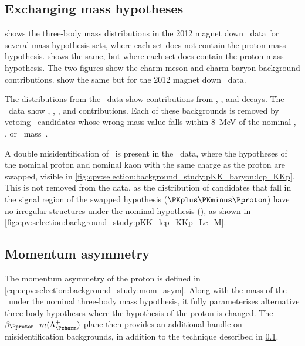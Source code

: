\subsection{Exchanging mass hypotheses}
\label{chap:cpv:selection:background_study:mass_hypo}

 shows the three-body mass
distributions in the 2012 magnet down \pKK\ data for several mass hypothesis
sets, where each set does not contain the proton mass hypothesis.
 shows the same, but where
each set does contain the proton mass hypothesis.
The two figures show the charm meson and charm baryon background contributions.
show the same but for the 2012 magnet down \ppipi\ data.

The distributions from the \pKK\ data show contributions from
\decay{\PDplus}{\PKplus\PKminus\Ppiplus},
\decay{\PDsplus}{\PKplus\PKminus\Ppiplus}, and
\decay{\PLambdac}{\Pproton\PKminus\Ppiplus} decays.
The \ppipi\ data show \decay{\PDplus}{\PKplus\Ppiminus\Ppiplus},
\decay{\PDplus}{\PKplus\PKminus\Ppiplus},
\decay{\PDsplus}{\PKplus\Ppiminus\Ppiplus}, and
\decay{\PDsplus}{\PKplus\PKminus\Ppiplus} contributions.
Each of these backgrounds is removed by vetoing \PLambdac\ candidates whose
wrong-mass value falls within \SI{8}{\MeV} of the nominal \PDplus, \PDsplus, or
\PLambdac\ mass~\cite{PDG2014}.

A double misidentification of \pKK\ is present in the \pKK\ data, where the
hypotheses of the nominal proton and nominal kaon with the same charge as the
proton are swapped, visible in
\cref{fig:cpv:selection:background_study:pKK_baryon:lcp_KKp}.
This is not removed from the data, as the distribution of candidates that fall
in the signal region of the swapped hypothesis ($\PKplus\PKminus\Pproton$) have
no irregular structures under the nominal hypothesis (\pKK), as shown in
\cref{fig:cpv:selection:background_study:pKK_lcp_KKp_Lc_M}.

\subsection{Momentum asymmetry}
\label{chap:cpv:selection:background_study:mom_asym}

The momentum asymmetry of the proton is defined in
\cref{eqn:cpv:selection:background_study:mom_asym}.
Along with the mass of the \PLambdac\ under the nominal three-body mass
hypothesis, it fully parameterises alternative three-body hypotheses where the
hypothesis of the proton is changed.
The $\beta_{\Pproton}$--$m(\PLambdac)$ plane then provides an additional handle
on misidentification backgrounds, in addition to the technique described in
\cref{chap:cpv:selection:background_study:mass_hypo}.

